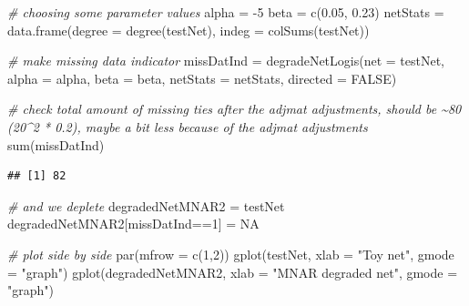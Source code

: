 \documentclass[
]{article}
\newenvironment{Shaded}{\begin{snugshade}}{\end{snugshade}}
\newcommand{\AttributeTok}[1]{\textcolor[rgb]{0.77,0.63,0.00}{#1}}
\newcommand{\CommentTok}[1]{\textcolor[rgb]{0.56,0.35,0.01}{\textit{#1}}}
\newcommand{\ConstantTok}[1]{\textcolor[rgb]{0.00,0.00,0.00}{#1}}
\newcommand{\DecValTok}[1]{\textcolor[rgb]{0.00,0.00,0.81}{#1}}
\newcommand{\FloatTok}[1]{\textcolor[rgb]{0.00,0.00,0.81}{#1}}
\newcommand{\FunctionTok}[1]{\textcolor[rgb]{0.00,0.00,0.00}{#1}}
\newcommand{\NormalTok}[1]{#1}
\newcommand{\OtherTok}[1]{\textcolor[rgb]{0.56,0.35,0.01}{#1}}
\newcommand{\SpecialCharTok}[1]{\textcolor[rgb]{0.00,0.00,0.00}{#1}}
\newcommand{\StringTok}[1]{\textcolor[rgb]{0.31,0.60,0.02}{#1}}
\begin{document}
\begin{Shaded}
\begin{Highlighting}[]
\CommentTok{\# choosing some parameter values}
\NormalTok{alpha }\OtherTok{=} \SpecialCharTok{{-}}\DecValTok{5}
\NormalTok{beta }\OtherTok{=} \FunctionTok{c}\NormalTok{(}\FloatTok{0.05}\NormalTok{, }\FloatTok{0.23}\NormalTok{)}
\NormalTok{netStats }\OtherTok{=} \FunctionTok{data.frame}\NormalTok{(}\AttributeTok{degree =} \FunctionTok{degree}\NormalTok{(testNet), }\AttributeTok{indeg =} \FunctionTok{colSums}\NormalTok{(testNet))}

\CommentTok{\# make missing data indicator}
\NormalTok{missDatInd }\OtherTok{=} \FunctionTok{degradeNetLogis}\NormalTok{(}\AttributeTok{net =}\NormalTok{ testNet,}
                             \AttributeTok{alpha =}\NormalTok{ alpha,}
                             \AttributeTok{beta =}\NormalTok{ beta,}
                             \AttributeTok{netStats =}\NormalTok{ netStats,}
                             \AttributeTok{directed =} \ConstantTok{FALSE}\NormalTok{)}

\CommentTok{\# check total amount of missing ties after the adjmat adjustments, should be \textasciitilde{}80 (20\^{}2 * 0.2), maybe a bit less because of the adjmat adjustments}
\FunctionTok{sum}\NormalTok{(missDatInd)}
\end{Highlighting}
\end{Shaded}

\begin{verbatim}
## [1] 82
\end{verbatim}

\begin{Shaded}
\begin{Highlighting}[]
\CommentTok{\# and we deplete}
\NormalTok{degradedNetMNAR2 }\OtherTok{=}\NormalTok{ testNet}
\NormalTok{degradedNetMNAR2[missDatInd}\SpecialCharTok{==}\DecValTok{1}\NormalTok{] }\OtherTok{=} \ConstantTok{NA}

\CommentTok{\# plot side by side}
\FunctionTok{par}\NormalTok{(}\AttributeTok{mfrow =} \FunctionTok{c}\NormalTok{(}\DecValTok{1}\NormalTok{,}\DecValTok{2}\NormalTok{))}
\FunctionTok{gplot}\NormalTok{(testNet, }\AttributeTok{xlab =} \StringTok{"Toy net"}\NormalTok{, }\AttributeTok{gmode =} \StringTok{"graph"}\NormalTok{)}
\FunctionTok{gplot}\NormalTok{(degradedNetMNAR2, }\AttributeTok{xlab =} \StringTok{"MNAR degraded net"}\NormalTok{, }\AttributeTok{gmode =} \StringTok{"graph"}\NormalTok{)}
\end{Highlighting}
\end{Shaded}
\end{document}

